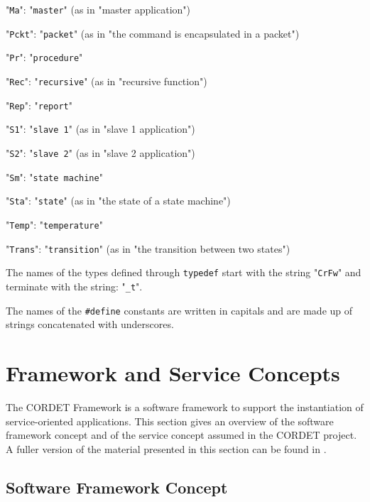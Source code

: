 \documentclass[a4paper,10pt]{article}
\let\stdsection\section
\renewcommand\section{\newpage\stdsection}
\newenvironment{fw_itemize}						%
{\begin{itemize}
  \setlength{\itemsep}{1mm}
  \setlength{\parskip}{0pt}
  \setlength{\parsep}{0pt}}
{\end{itemize}}
\begin{document}
\begin{fw_itemize}
\item "\texttt{Ma}": "\texttt{master}" (as in "master application")
\item "\texttt{Pckt}": "\texttt{packet}" (as in "the command is encapsulated in a packet")
\item "\texttt{Pr}": "\texttt{procedure}"
\item "\texttt{Rec}": "\texttt{recursive}" (as in "recursive function")
\item "\texttt{Rep}": "\texttt{report}"
\item "\texttt{S1}": "\texttt{slave 1}" (as in "slave 1 application")
\item "\texttt{S2}": "\texttt{slave 2}" (as in "slave 2 application")
\item "\texttt{Sm}": "\texttt{state machine}"
\item "\texttt{Sta}": "\texttt{state}" (as in "the state of a state machine")
\item "\texttt{Temp}": "\texttt{temperature}"
\item "\texttt{Trans}": "\texttt{transition}" (as in "the transition between two states")
\end{fw_itemize}

The names of the types defined through \texttt{typedef} start with the string "\texttt{CrFw}" and 
terminate with the string: "\texttt{\_t}".

The names of the \texttt{\#define} constants are written in capitals and are made 
up of strings concatenated with underscores.

\section{Framework and Service Concepts}
The CORDET Framework is a software framework to support the instantiation of service-oriented applications. 
This section gives an overview of the software framework concept and of the service concept assumed in the CORDET project.
A fuller version of the material presented in this section can be found in \cite{ref:cordetfw}.

\subsection{Software Framework Concept}\label{sec:SwFwConcept} 

\end{document}
